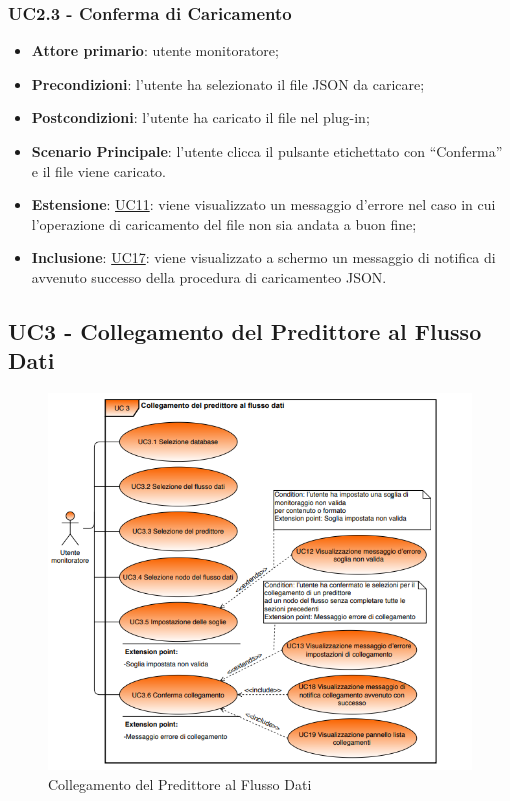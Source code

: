		\subsubsection{UC2.3 - Conferma di Caricamento}
		\begin{itemize}
			\item\textbf{Attore primario}: utente monitoratore;
			\item\textbf{Precondizioni}: l’utente ha selezionato il file JSON da caricare;
			\item\textbf{Postcondizioni}: l’utente ha caricato il file nel plug-in; 
			\item\textbf{Scenario Principale}: l’utente clicca il pulsante etichettato con “Conferma” e il file viene caricato.
			\item\textbf{Estensione}: \hyperref[par:UC11]{UC11}: viene visualizzato un messaggio d’errore nel caso in cui l’operazione di caricamento del file non sia andata a buon fine;				
			\item\textbf{Inclusione}: \hyperref[par:UC17]{UC17}: viene visualizzato a schermo un messaggio di notifica di avvenuto successo della procedura di caricamenteo JSON.	
		\end{itemize}


	\label{par:UC3}
	\subsection{UC3 - Collegamento del Predittore al Flusso Dati}

		\begin{figure}[H]
		\centering
		\includegraphics[scale=0.70]{../Analisi_dei_requisiti/img/Diagrammi_UML/UC3_collegamento_flusso_dati.png}
		\caption{Collegamento del Predittore al Flusso Dati}
		\end{figure}	


